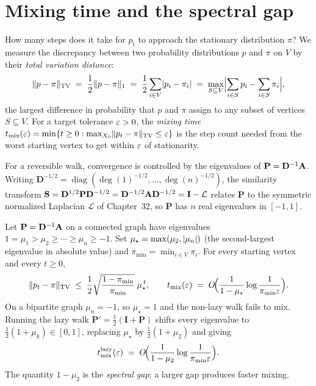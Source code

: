 \section{Mixing time and the spectral gap}\label{ch35:mixing}

How many steps does it take for $p_t$ to approach the stationary distribution $\pi$? We measure the discrepancy between two probability distributions $p$ and $\pi$ on $V$ by their \emph{total variation distance}:
\[
  \norm{p-\pi}_{\mathrm{TV}} \;=\; \frac{1}{2}\norm{p-\pi}_1 \;=\; \frac{1}{2}\sum_{i\in V}\abs{p_i-\pi_i} \;=\; \max_{S\subseteq V}\abs[\Big]{\sum_{i\in S} p_i - \sum_{i\in S}\pi_i},
\]
the largest difference in probability that $p$ and $\pi$ assign to any subset of vertices $S\subseteq V$. For a target tolerance $\eps>0$, the \emph{mixing time} $t_{\mathrm{mix}}(\eps)=\min\set{t\ge 0 : \max_{X_0}\norm{p_t-\pi}_{\mathrm{TV}}\le\eps}$ is the step count needed from the worst starting vertex to get within $\eps$ of stationarity.

For a reversible walk, convergence is controlled by the eigenvalues of $\mathbf{P}=\mathbf{D}^{-1}\Adjm$. Writing $\mathbf{D}^{-1/2}=\operatorname{diag}(\deg(1)^{-1/2},\dots,\deg(n)^{-1/2})$, the similarity transform $\mathbf{S}=\mathbf{D}^{1/2}\mathbf{P}\mathbf{D}^{-1/2}=\mathbf{D}^{-1/2}\Adjm\mathbf{D}^{-1/2}=\mathbf{I}-\mathcal{L}$ relates $\mathbf{P}$ to the symmetric normalized Laplacian $\mathcal{L}$ of Chapter~32, so $\mathbf{P}$ has $n$ real eigenvalues in $[-1,1]$.

\begin{theorem}\label{ch35:thm-mixing}
Let $\mathbf{P}=\mathbf{D}^{-1}\Adjm$ on a connected graph have eigenvalues $1=\mu_1>\mu_2\ge\cdots\ge\mu_n\ge-1$. Set $\mu_\star=\max(\mu_2,\abs{\mu_n})$ (the second-largest eigenvalue in absolute value) and $\pi_{\min}=\min_{i\in V}\pi_i$. For every starting vertex and every $t\ge 0$,
\[
  \norm{p_t-\pi}_{\mathrm{TV}}\;\le\;\frac{1}{2}\sqrt{\frac{1-\pi_{\min}}{\pi_{\min}}}\;\mu_\star^{\,t},
  \qquad
  t_{\mathrm{mix}}(\eps)\;=\;\Oh\!\Bigl(\frac{1}{1-\mu_\star}\log\frac{1}{\pi_{\min}\eps}\Bigr).
\]
On a bipartite graph $\mu_n=-1$, so $\mu_\star=1$ and the non-lazy walk fails to mix. Running the lazy walk $\mathbf{P}'=\tfrac12(\mathbf{I}+\mathbf{P})$ shifts every eigenvalue to $\tfrac12(1+\mu_k)\in[0,1]$, replacing $\mu_\star$ by $\tfrac12(1+\mu_2)$ and giving
\[
  t_{\mathrm{mix}}^{\mathrm{lazy}}(\eps) \;=\; \Oh\!\Bigl(\frac{1}{1-\mu_2}\log\frac{1}{\pi_{\min}\eps}\Bigr).
\]
The quantity $1-\mu_2$ is the \emph{spectral gap}; a larger gap produces faster mixing.
\end{theorem}

